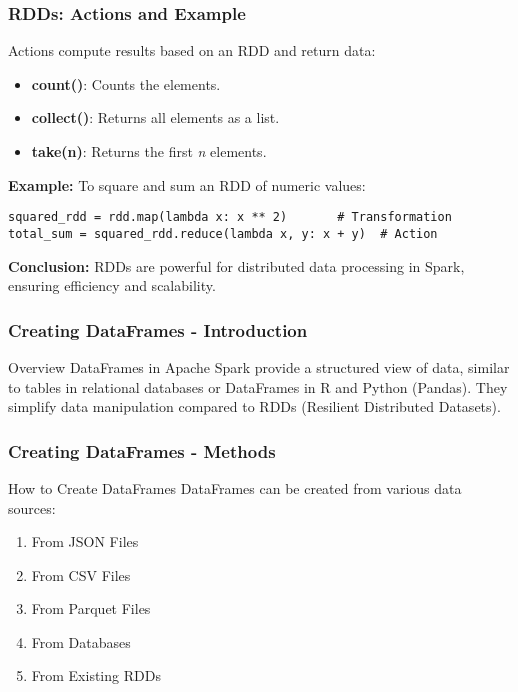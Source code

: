 \documentclass[aspectratio=169]{beamer}
\begin{document}
\begin{frame}[fragile]
    \frametitle{RDDs: Actions and Example}
    Actions compute results based on an RDD and return data:
    \begin{itemize}
        \item \textbf{count()}: Counts the elements.
        \item \textbf{collect()}: Returns all elements as a list.
        \item \textbf{take(n)}: Returns the first \textit{n} elements.
    \end{itemize}

    \textbf{Example:} To square and sum an RDD of numeric values:
    \begin{lstlisting}
squared_rdd = rdd.map(lambda x: x ** 2)       # Transformation
total_sum = squared_rdd.reduce(lambda x, y: x + y)  # Action
    \end{lstlisting}

    \textbf{Conclusion:} RDDs are powerful for distributed data processing in Spark, ensuring efficiency and scalability.
\end{frame}

\begin{frame}[fragile]
    \frametitle{Creating DataFrames - Introduction}
    \begin{block}{Overview}
        DataFrames in Apache Spark provide a structured view of data, similar to tables in relational databases or DataFrames in R and Python (Pandas). They simplify data manipulation compared to RDDs (Resilient Distributed Datasets).
    \end{block}
\end{frame}

\begin{frame}[fragile]
    \frametitle{Creating DataFrames - Methods}
    \begin{block}{How to Create DataFrames}
        DataFrames can be created from various data sources:
        \begin{enumerate}
            \item From JSON Files
            \item From CSV Files
            \item From Parquet Files
            \item From Databases
            \item From Existing RDDs
        \end{enumerate}
    \end{block}
\end{frame}
\end{document}
